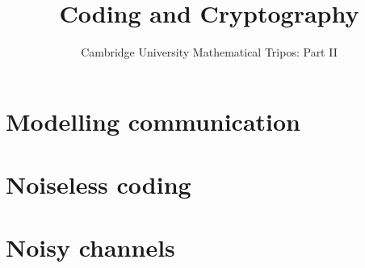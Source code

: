 \documentclass{article}
\title{Coding and Cryptography}
\author{Cambridge University Mathematical Tripos: Part II}
\begin{document}
\maketitle

\tableofcontentsnewpage{}

\section{Modelling communication}

\section{Noiseless coding}

\section{Noisy channels}

\end{document}
